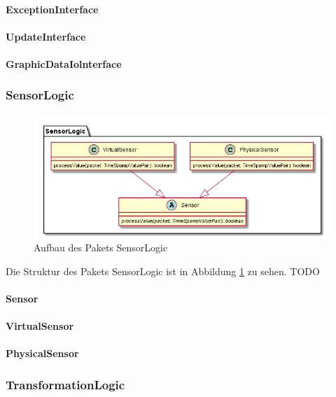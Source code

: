 \documentclass[parskip=full]{scrartcl}
\begin{document}
\paragraph{ExceptionInterface}
\paragraph{UpdateInterface}
\paragraph{GraphicDataIolnterface}




\subsubsection{SensorLogic}
\begin{figure}[htbp]
	\begin{center}
		\includegraphics[width = 12cm]{Grafiken/SensorLogic.png}
		\caption{Aufbau des Pakets SensorLogic}
		\label{SensorLogic}
	\end{center}
\end{figure}

Die Struktur des Pakets SensorLogic ist in Abbildung \ref{SensorLogic} zu sehen.
TODO


\paragraph{Sensor}
\paragraph{VirtualSensor}
\paragraph{PhysicalSensor}

\subsubsection{TransformationLogic}
\end{document}
